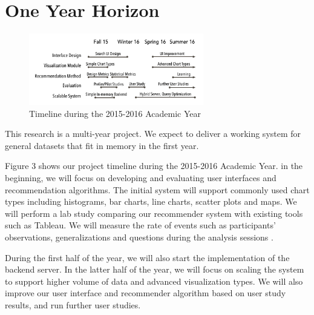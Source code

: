 \section*{One Year Horizon}

\begingroup
\setlength{\columnsep}{16pt}

\begin{figure}
\vspace{-0.4in}

  \includegraphics[width=3in]{gantt-chart.png}
  \vspace{-0.3in}
  \caption{Timeline during the 2015-2016 Academic Year}

\label{fig:plan}
\vspace{-0.1in}
\end{figure}


This research is a multi-year project.  We expect to deliver a working system for general datasets that fit in memory in the first year.

Figure 3 shows our project timeline during the 2015-2016 Academic Year.
in the beginning, we will focus on developing and evaluating user interfaces and recommendation algorithms.
The initial system will support commonly used chart types including histograms, bar charts, line charts, scatter plots and maps.
We will perform a lab study comparing our recommender system with existing tools such as Tableau.
We will measure the rate of events such as participants’ observations, generalizations and questions during the analysis sessions \cite{liu:latency}.

\endgroup

During the first half of the year, we will also start the implementation of the backend server.  In the latter half of the year, we will focus on scaling the system to support higher volume of data and advanced visualization types. We will also improve our user interface and recommender algorithm based on user study results, and run further user studies.


